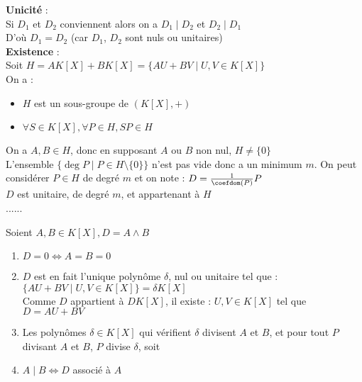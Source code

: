 \documentclass[12pt,a4paper]{report}
\begin{document}
        \begin{demo}
        \textbf{Unicité} : \\
        Si $D_1$ et $D_2$ conviennent alors on a $D_1 \mid D_2$ et $D_2 \mid D_1$ \\
        D'où $D_1 = D_2$ (car $D_1$, $D_2$ sont nuls ou unitaires)  
        \\
        \textbf{Existence} : \\
        Soit $H=AK[X]+BK[X]=\lbrace AU + BV \mid U,V \in K[X]\rbrace$\\
        On a : 
        \begin{itemize}
            \item $H$ est un sous-groupe de $(K[X],+)$
            \item $\forall S \in K[X], \forall P \in H, SP \in H$
        \end{itemize}
        On a $A,B \in H$, donc en supposant $A$ ou $B$ non nul, $H\neq \lbrace 0 \rbrace$\\
        L'ensemble $\lbrace \deg P \mid P\in H \setminus \lbrace0\rbrace \rbrace$ n'est pas vide donc a un minimum $m$. On peut considérer $P\in H$ de degré $m$ et on note : $D=\frac{1}{\coefdom(P)} P$\\
        $D$ est unitaire, de degré $m$, et appartenant à $H$\\
        ......
        \end{demo}
        
        \begin{remarque}[Remarques]
        Soient $A,B \in K[X], D=A\wedge B$
        \begin{enumerate}
            \item $D=0 \Longleftrightarrow A=B=0$
            \item $D$ est en fait l'unique polynôme $\delta$, nul ou unitaire tel que : \\
            $\lbrace AU + BV \mid U,V \in K[X]\rbrace = \delta K[X]$\\
            Comme $D$ appartient à $DK[X]$, il existe : $U,V \in K[X]$ tel que $D= AU+BV$ 
            \item Les polynômes $\delta \in K[X]$ qui vérifient $\delta$ divisent $A$ et $B$, et pour tout $P$ divisant $A$ et $B$, $P$ divise $\delta$, soit 
            \item $A \mid B \Longleftrightarrow D$ associé à $A$
        \end{enumerate}
        \end{remarque}
        
\end{document}
